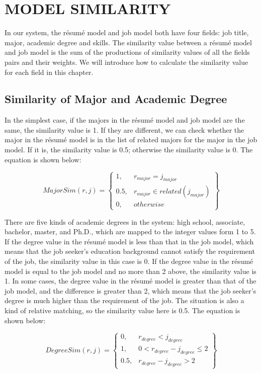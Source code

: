 \chapter{MODEL SIMILARITY}

In our system, the r\'esum\'e model and job model both have four fields: job title, major, academic degree and skills. The similarity value between a r\'esum\'e model and job model is the sum of the productions of similarity values of all the fields pairs and their weights. We will introduce how to calculate the similarity value for each field in this chapter.

\section{Similarity of Major and Academic Degree}

In the simplest case, if the majors in the r\'esum\'e model and job model are the same, the similarity value is 1. If they are different, we can check whether the major in the r\'esum\'e model is in the list of related majors for the major in the job model. If it is, the similarity value is 0.5; otherwise the similarity value is 0. The equation is shown below:

$$ MajorSim(r,j ) = \begin{Bmatrix}
1, & r_{major} = j_{major} \\
0.5, & r_{major} \in related( j_{major} ) \\
0, & otherwise
\end{Bmatrix} $$

There are five kinds of academic degrees in the system:  high school, associate, bachelor, master, and Ph.D., which are mapped to the integer values form 1 to 5. If the degree value in the r\'esum\'e model is less than that in the job model, which means that the job seeker's education background cannot satisfy the requirement of the job, the similarity value in this case is 0. If the degree value in the r\'esum\'e model is equal to the job model and no more than 2 above, the similarity value is 1. In some cases, the degree value in the r\'esum\'e model is greater than that of the job model, and the difference is greater than 2, which means that the job seeker's degree is much higher than the requirement of the job. The situation is also a kind of relative matching, so the similarity value here is 0.5. The equation is shown below:

$$ DegreeSim(r,j ) = \begin{Bmatrix}
0,   & r_{degree} < j_{degree} \\
1,   & 0 < r_{degree} - j_{degree} \leqslant 2  \\
0.5, & r_{degree} - j_{degree} > 2
\end{Bmatrix} $$

